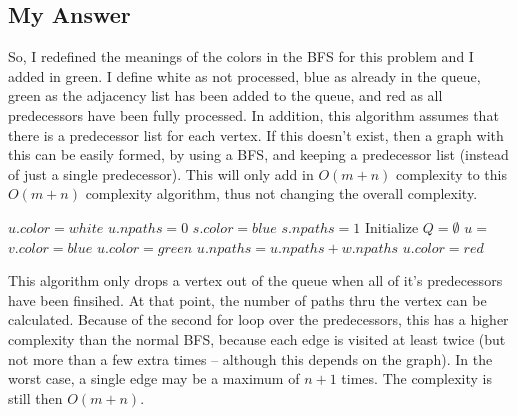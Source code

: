 \documentclass{article}
\begin{document}
\subsection{My Answer}

So, I redefined the meanings of the colors in the BFS for this
problem and I added in green.  I define white as not processed, blue
as already in the queue, green as the adjacency list
has been added to the queue, and red as all predecessors have been
fully processed.  In addition, this algorithm assumes that there is a
predecessor list for each vertex.  If this doesn't exist, then a graph
with this can be easily formed, by using a BFS, and keeping a
predecessor list (instead of just a single predecessor).  This will
only add in $O(m+n)$ complexity to this $O(m+n)$ complexity algorithm,
thus not changing the overall complexity.

{\singlespacing
\begin{algorithmic}
      \State $u.color  = white$
      \State $u.npaths = 0$
    \EndFor
    \State $s.color = blue$
    \State $s.npaths = 1$
    \State Initialize $Q = \emptyset$
    \State {}
      \State $u = $ 
          \State $v.color = blue$
          \State {}
        \EndIf
      \EndFor
      \State $u.color = green$
          \State $u.npaths = u.npaths + w.npaths$
          \State {} 
        \Else
          \State {}
        \EndIf
      \EndFor
        \State $u.color = red$
      \EndIf
    \EndWhile
\EndFunction    
\end{algorithmic}
}

This algorithm only drops a vertex out of the queue when all of it's
predecessors have been finsihed.  At that point, the number of paths
thru the vertex can be calculated. 
Because of the second for loop over the predecessors, this has a
higher complexity than the normal BFS, because each edge is visited at
least twice (but not more than a few extra times -- although this
depends on the graph).  In the worst case, a single edge may be a
maximum of $n+1$ times. 
The complexity is still then $O(m+n)$. 
\end{document}
